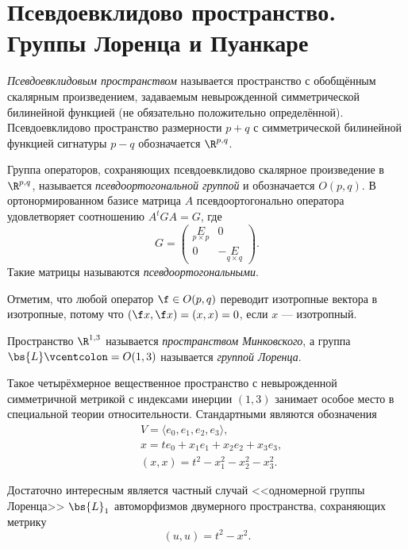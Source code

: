 \section{Псевдоевклидово пространство. Группы Лоренца и Пуанкаре}

\begin{definition}
    \textit{Псевдоевклидовым пространством} называется пространство с обобщённым скалярным произведением, задаваемым невырожденной симметрической билинейной функцией (не обязательно положительно определённой). Псевдоевклидово пространство размерности $p + q$ с симметрической билинейной функцией сигнатуры $p - q$ обозначается $\R^{p, q}$.
\end{definition}

\begin{definition}
    Группа операторов, сохраняющих псевдоевклидово скалярное произведение в $\R^{p, q}$, называется \textit{псевдоортогональной группой} и обозначается $O(p, q)$. В ортонормированном базисе матрица $A$ псевдоортогонально оператора удовлетворяет соотношению $A^tGA = G$, где
    \[
    G =
    \begin{pmatrix}
        \underset{p \times p}{E} & 0\\
        0 & -\underset{q \times q}{E}
    \end{pmatrix}.
    \]
    Такие матрицы называются \textit{псевдоортогональными}.
\end{definition}

Отметим, что любой оператор $\f \in O(p, q)$ переводит изотропные вектора в изотропные, потому что $(\f x, \f x) = (x, x) = 0$, если $x$ --- изотропный.

\begin{definition}
    Пространство $\R^{1, 3}$ называется \textit{пространством Минковского}, а группа $\bs{L} \vcentcolon = O(1, 3)$ называется \textit{группой Лоренца}.
\end{definition}

Такое четырёхмерное вещественное пространство с невырожденной симметричной метрикой с индексами инерции $(1, 3)$ занимает особое место в специальной теории относительности. Стандартными являются обозначения
\begin{align*}
    &V = \langle e_0, e_1, e_2, e_3\rangle,\\
    &x = te_0 + x_1e_1 + x_2e_2 + x_3e_3,\\
    &(x, x) = t^2 - x_1^2 - x_2^2 - x_3^2.
\end{align*}

Достаточно интересным является частный случай <<одномерной группы Лоренца>> $\bs{L}_1$ автоморфизмов двумерного пространства, сохраняющих метрику
\[
    (u, u) = t^2 - x^2.
\]

